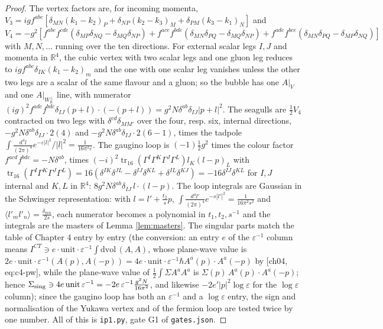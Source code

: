 \documentclass[11pt]{article}
\theoremstyle{plain}
\theoremstyle{definition}
\numberwithin{equation}{section}
\newcommand{\Wp}{W_{\mathbb R}^\perp}
\begin{document}
\begin{proof}
The vertex factors are, for incoming momenta, $V_3=ig f^{abc}[\delta_{MN}(k_1-k_2)_P+\delta_{NP}(k_2-k_3)_M+\delta_{PM}(k_3-k_1)_N]$ and $V_4=-g^2[f^{abe}f^{cde}(\delta_{MP}\delta_{NQ}-\delta_{MQ}\delta_{NP})+f^{ace}f^{bde}(\delta_{MN}\delta_{PQ}-\delta_{MQ}\delta_{NP})+f^{ade}f^{bce}(\delta_{MN}\delta_{PQ}-\delta_{MP}\delta_{NQ})]$ with $M,N,\dots$ running over the ten directions. For external scalar legs $I,J$ and momenta in $\mathbb R^4$, the cubic vertex with two scalar legs and one gluon leg reduces to $igf^{abc}\delta_{IK}(k_1-k_2)_m$ and the one with one scalar leg vanishes unless the other two legs are a scalar of the same flavour and a gluon; so the bubble has one $A|_V$ and one $A|_{\Wp}$ line, with numerator $(ig)^2f^{adc}f^{bdc}\delta_{IJ}(p+l)\cdot(-(p+l))=g^2N\delta^{ab}\delta_{IJ}|p+l|^2$. The seagulls are $\tfrac12V_4$ contracted on two legs with $\delta^{cd}\delta_{MM'}$ over the four, resp. six, internal directions, $-g^2N\delta^{ab}\delta_{IJ}\cdot2(4)$ and $-g^2N\delta^{ab}\delta_{IJ}\cdot2(6-1)$, times the tadpole $\int\frac{d^4l}{(2\pi)^4}e^{-\varepsilon|l|^2}/|l|^2=\frac1{16\pi^2\varepsilon}$. The gaugino loop is $(-1)\tfrac12g^2$ times the colour factor $f^{acd}f^{bdc}=-N\delta^{ab}$, times $(-i)^2\operatorname{tr}_{16}(\Gamma^I\Gamma^K\Gamma^J\Gamma^L)l_K(l-p)_L$ with $\operatorname{tr}_{16}(\Gamma^I\Gamma^K\Gamma^J\Gamma^L)=16(\delta^{IK}\delta^{JL}-\delta^{IJ}\delta^{KL}+\delta^{IL}\delta^{KJ})=-16\delta^{IJ}\delta^{KL}$ for $I,J$ internal and $K,L$ in $\mathbb R^4$: $8g^2N\delta^{ab}\delta_{IJ}\,l\cdot(l-p)$. The loop integrals are Gaussian in the Schwinger representation: with $l=l'+\tfrac{t_2}{s}p$, $\int\frac{d^4l'}{(2\pi)^4}e^{-s|l'|^2}=\frac1{16\pi^2s^2}$ and $\langle l'_ml'_n\rangle=\frac{\delta_{mn}}{2s}$, each numerator becomes a polynomial in $t_1,t_2,s^{-1}$ and the integrals are the masters of Lemma \ref{lem:masters}. The singular parts match the table of Chapter 4 entry by entry (the conversion: an entry $e$ of the $\varepsilon^{-1}$ column means $I^{CT}\ni e\cdot\mathrm{unit}\cdot\varepsilon^{-1}\int\mathrm{dvol}\,(A,A)$, whose plane-wave value is $2e\cdot\mathrm{unit}\cdot\varepsilon^{-1}(A(p),A(-p))=4e\cdot\mathrm{unit}\cdot\varepsilon^{-1}\hbar A^a(p)\cdot A^a(-p)$ by [ch04, eq:c4-pw], while the plane-wave value of $\tfrac12\int\Sigma A^aA^a$ is $\Sigma(p)\,A^a(p)\cdot A^a(-p)$; hence $\Sigma_{\rm sing}\ni4e\,\mathrm{unit}\,\varepsilon^{-1}=-2e\,\varepsilon^{-1}\frac{g^2N}{16\pi^2}$, and likewise $-2e'|p|^2\log\varepsilon$ for the $\log\varepsilon$ column); since the gaugino loop has both an $\varepsilon^{-1}$ and a $\log\varepsilon$ entry, the sign and normalisation of the Yukawa vertex and of the fermion loop are tested twice by one number. All of this is \texttt{ip1.py}, gate G1 of \texttt{gates.json}.
\end{proof}
\end{document}
